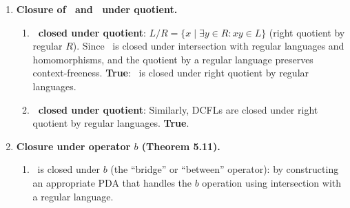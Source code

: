 \begin{enumerate}[{10.}1. ]
\begin{enumerate}
\item $L_1\cdot L_2$ need not be DCFL: Example from Exercise 10.26.
\item $L_1 - L_2$ need not be DCFL: Let $L_1$ be any DCFL and $L_2$ be any CFL that is not a DCFL; then $L_1 - L_2 = L_1 \cap \overline{L_2}$. Since DCFLs are not closed under complement, $\overline{L_2}$ need not be a CFL at all. A concrete pair: $L_1 = \{\pmb{a}^n\pmb{b}^n\pmb{c}^m \mid n,m\geq 0\}$ (DCFL) and $L_2 = \{\pmb{a}^n\pmb{b}^m\pmb{c}^m \mid n,m\geq 0\}$ (DCFL). Then $L_1 - L_2 = \{w\in L_1 \mid |w|_{\pmb{b}}\neq|w|_{\pmb{c}}\}$; verifying this is not DCFL follows from the non-closure of DCFLs under difference.
\item $L_1^*$ need not be DCFL: Exercise 10.27.
\item $L_1^r$ need not be DCFL: $L = \{ww^r\pmb{c}\}$ (DCFL); $L^r = \{\pmb{c}ww^r\}$ which is also DCFL. A better example: $L$ is a DCFL such that $L^r$ is CFL but not DCFL.
\end{enumerate}

\item \textbf{Closure of \PSIG\ and \ASIG\ under quotient.}

\begin{enumerate}
\item \textbf{\PSIG\ closed under quotient}: $L/R = \{x \mid \exists y\in R: xy\in L\}$ (right quotient by regular $R$). Since \PSIG\ is closed under intersection with regular languages and homomorphisms, and the quotient by a regular language preserves context-freeness. \textbf{True}: \PSIG\ is closed under right quotient by regular languages.

\item \textbf{\ASIG\ closed under quotient}: Similarly, DCFLs are closed under right quotient by regular languages. \textbf{True}.
\end{enumerate}

\item \textbf{Closure under operator $b$ (Theorem 5.11).}

\begin{enumerate}
\item \PSIG\ is closed under $b$ (the ``bridge'' or ``between'' operator): by constructing an appropriate PDA that handles the $b$ operation using intersection with a regular language.


\end{enumerate}
\end{enumerate}
